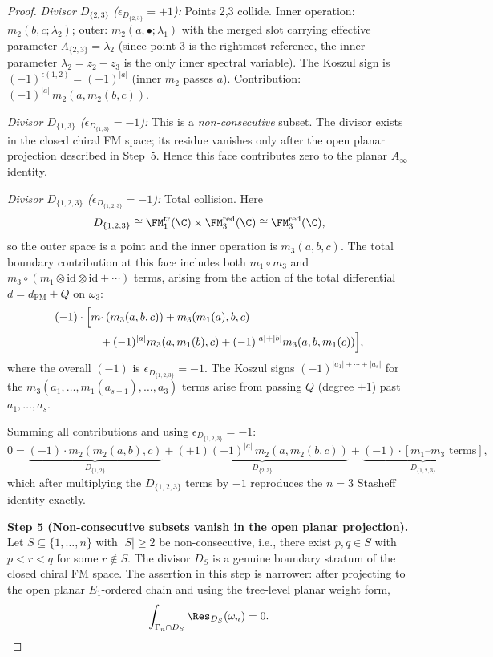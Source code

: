 \begin{proof}
\emph{Divisor $D_{\{2,3\}}$ ($\epsilon_{D_{\{2,3\}}} = +1$):}
Points 2,3 collide. Inner operation: $m_2(b,c;\lambda_2)$; outer: $m_2(a,\bullet;\lambda_1)$ with the merged slot carrying effective parameter $\Lambda_{\{2,3\}} = \lambda_2$ (since point 3 is the rightmost reference, the inner parameter $\lambda_2 = z_2 - z_3$ is the only inner spectral variable). The Koszul sign is $(-1)^{\epsilon(1,2)} = (-1)^{|a|}$ (inner $m_2$ passes $a$). Contribution: $(-1)^{|a|}\,m_2(a,m_2(b,c))$.

\emph{Divisor $D_{\{1,3\}}$ ($\epsilon_{D_{\{1,3\}}} = -1$):}
This is a \emph{non-consecutive} subset. The divisor exists in the
closed chiral FM space; its residue vanishes only after the open
planar projection described in Step~5. Hence this face contributes
zero to the planar \(A_\infty\) identity.

\emph{Divisor $D_{\{1,2,3\}}$ ($\epsilon_{D_{\{1,2,3\}}} = -1$):}
Total collision. Here
\[
D_{\{1,2,3\}}\cong
\FM_1^{\mathrm{tr}}(\C)\times\FM_3^{\mathrm{red}}(\C)
\cong \FM_3^{\mathrm{red}}(\C),
\]
so the outer space is a point and the inner operation is \(m_3(a,b,c)\).
The total boundary contribution at this face includes both
\(m_1 \circ m_3\) and
\(m_3 \circ (m_1 \otimes \mathrm{id} \otimes \mathrm{id}+\cdots)\)
terms, arising from the action of the total differential
\(d=d_{\mathrm{FM}}+Q\) on \(\omega_3\):
\begin{align*}
&(-1) \cdot \Bigl[m_1(m_3(a,b,c)) + m_3(m_1(a),b,c) \\
&\qquad\qquad + (-1)^{|a|} m_3(a,m_1(b),c) + (-1)^{|a|+|b|} m_3(a,b,m_1(c))\Bigr],
\end{align*}
where the overall $(-1)$ is $\epsilon_{D_{\{1,2,3\}}} = -1$. The Koszul signs $(-1)^{|a_1|+\cdots+|a_s|}$ for the $m_3(a_1,\ldots,m_1(a_{s+1}),\ldots,a_3)$ terms arise from passing $Q$ (degree $+1$) past $a_1,\ldots,a_s$.

Summing all contributions and using $\epsilon_{D_{\{1,2,3\}}} = -1$:
\[
0 = \underbrace{(+1) \cdot m_2(m_2(a,b),c)}_{D_{\{1,2\}}}
+ \underbrace{(+1)(-1)^{|a|}\,m_2(a,m_2(b,c))}_{D_{\{2,3\}}}
+ \underbrace{(-1) \cdot [\text{$m_1$--$m_3$ terms}]}_{D_{\{1,2,3\}}},
\]
which after multiplying the $D_{\{1,2,3\}}$ terms by $-1$ reproduces the $n = 3$ Stasheff identity exactly.

\medskip
\textbf{Step 5 (Non-consecutive subsets vanish in the open planar
projection).}
Let $S \subseteq \{1,\ldots,n\}$ with $|S| \geq 2$ be
non-consecutive, i.e., there exist $p, q \in S$ with $p < r < q$ for
some $r \notin S$. The divisor \(D_S\) is a genuine boundary stratum
of the closed chiral FM space. The assertion in this step is narrower:
after projecting to the open planar \(E_1\)-ordered chain and using the
tree-level planar weight form,
\[
\int_{\Gamma_n \cap D_S}\Res_{D_S}(\omega_n)=0.
\]


\end{proof}

